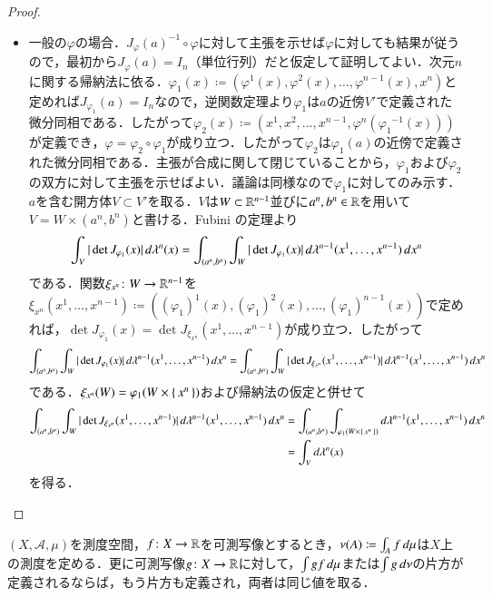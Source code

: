 \begin{proof}
\begin{itemize}
\item 一般の$\varphi$の場合．${J_{\varphi}(a)}^{-1} \circ \varphi$に対して主張を示せば$\varphi$に対しても結果が従うので，最初から$J_\varphi(a) = I_n$（単位行列）だと仮定して証明してよい．次元$n$に関する帰納法に依る．$\varphi_1(x) \coloneqq (\varphi^1(x), \varphi^2(x), \dots, \varphi^{n-1}(x), x^n)$と定めれば$J_{\varphi_1}(a) = I_n$なので，逆関数定理より$\varphi_1$は$a$の近傍$V'$で定義された微分同相である．したがって$\varphi_2(x) \coloneqq (x^1, x^2, \dots,x^{n-1}, \varphi^n({\varphi_1}^{-1}(x)))$が定義でき，$\varphi = \varphi_2 \circ \varphi_1$が成り立つ．したがって$\varphi_2$は$\varphi_1(a)$の近傍で定義された微分同相である．主張が合成に関して閉じていることから，$\varphi_1$および$\varphi_2$の双方に対して主張を示せばよい．議論は同様なので$\varphi_1$に対してのみ示す．$a$を含む開方体$V \subset V'$を取る．$V$は$W \subset \mathbb{R}^{n-1}$並びに$a^n, b^n \in \mathbb{R}$を用いて$V = W \times (a^n, b^n)$と書ける．Fubini の定理より
\begin{equation}
\int_V  |\det J_{\varphi_1}(x)| \mathop{}\!d \lambda^n(x) = \int_{(a^n,b^n)} \int_W  |\det J_{\varphi_1}(x)| \mathop{}\!d \lambda^{n-1}(x^1, \dots, x^{n-1}) \mathop{}\!d x^n
\end{equation}である．関数$\xi_{x^n} \colon W \to \mathbb{R}^{n-1}$を$\xi_{x^n}(x^1, \dots, x^{n-1}) \coloneqq ((\varphi_1)^1(x), (\varphi_1)^2(x), \dots, (\varphi_1)^{n-1}(x))$で定めれば，$\det J_{\varphi_1}(x) = \det J_{\xi_{x^n}}(x^1, \dots, x^{n-1})$が成り立つ．したがって
\begin{equation}
\int_{(a^n,b^n)} \int_W  |\det J_{\varphi_1}(x)| \mathop{}\!d \lambda^{n-1}(x^1, \dots, x^{n-1}) \mathop{}\!d x^n = \int_{(a^n,b^n)} \int_W  |\det J_{\xi_{x^n}}(x^1,\dots,x^{n-1})| \mathop{}\!d \lambda^{n-1}(x^1, \dots, x^{n-1}) \mathop{}\!d x^n
\end{equation}である．$\xi_{x^n}(W) = \varphi_1(W \times \set{x^n})$および帰納法の仮定と併せて
\begin{align}
\int_{(a^n,b^n)} \int_W  |\det J_{\xi_{x^n}}(x^1,\dots,x^{n-1})| \mathop{}\!d \lambda^{n-1}(x^1, \dots, x^{n-1}) \mathop{}\!d x^n &= \int_{(a^n,b^n)} \int_{\varphi_1(W\times \set{x^n})} \mathop{}\!d \lambda^{n-1}(x^1, \dots, x^{n-1}) \mathop{}\!d x^n \\
&= \int_V \mathop{}\!d \lambda^n(x)
\end{align}を得る．
\end{itemize}
\end{proof}

\begin{que}
$(X,\mathcal{A},\mu)$を測度空間，$f \colon X \to \mathbb{R}$を可測写像とするとき，$\nu(A) \coloneqq \int_A f \mathop{}\!d\mu$は$X$上の測度を定める．更に可測写像$g \colon X \to \mathbb{R}$に対して，$\int gf \mathop{}\!d \mu$または$\int g \mathop{}\!d \nu$の片方が定義されるならば，もう片方も定義され，両者は同じ値を取る．
\end{que}

